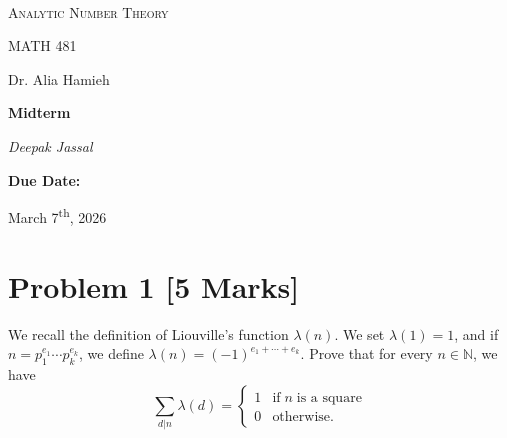 \documentclass[12pt]{article}
\renewcommand{\author}{Deepak Jassal}
\renewcommand{\coursename}{Analytic Number Theory}
\renewcommand{\coursecode}{MATH 481}
\renewcommand{\assignment}{Midterm}
\renewcommand{\instructor}{Dr. Alia Hamieh}
\renewcommand{\duedate}{March 7\textsuperscript{th}, 2026}
\begin{document}
\begin{titlepage}
	\centering
	\vspace*{2.0cm}	
	\\
	{\LARGE \textsc{\coursename}\par}
	\vspace{0.5cm}
	{\large\coursecode\par}
    \vspace{0.5cm}
    {\large\instructor\par}
	\vspace{1.5cm}
	{\huge\bfseries\assignment\par}
	\vspace{1cm}  
	{\LARGE\itshape\author\par}
    \vspace{2cm}
	{\large\bfseries Due Date:\par}
	\vspace{0.5cm}
	{\Large \duedate}\\
\end{titlepage}
\section*{Problem 1 [5 Marks]}
We recall the definition of Liouville's function $\lambda(n)$. We set $\lambda(1)=1$, and if $n=p_1^{e_1}\cdots p_k^{e_k}$, we define $\lambda(n)=(-1)^{e_1+\cdots+e_k}$. Prove that for every $n\in\mathbb{N}$, we have 
\[
    \sum_{d|n}\lambda(d)=\begin{cases}1&\text{if}\; n \;\text{is a square}\\0&\text{otherwise.}\end{cases}
\]
\end{document}

